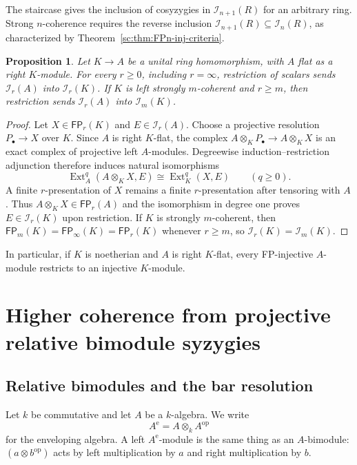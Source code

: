 \documentclass[11pt]{article}
\numberwithin{equation}{section}
\newtheorem{proposition}[theorem]{Proposition}
\theoremstyle{definition}
\theoremstyle{remark}
\newcommand{\Ext}{\operatorname{Ext}}
\newcommand{\FP}{\mathsf{FP}}
\begin{document}
The staircase gives the inclusion of cosyzygies in
$\mathcal I_{n+1}(R)$ for an arbitrary ring.  Strong $n$-coherence
requires the reverse inclusion
$\mathcal I_{n+1}(R)\subseteq\mathcal I_n(R)$, as characterized by
Theorem~\ref{sc:thm:FPn-inj-criteria}.

\begin{proposition}
\label{sc:prop:FPn-restriction}
Let $K\to A$ be a unital ring homomorphism, with $A$ flat as a
right $K$-module.  For every $r\ge0$, including $r=\infty$,
restriction of scalars sends $\mathcal I_r(A)$ into
$\mathcal I_r(K)$.  If $K$ is left strongly $m$-coherent and
$r\ge m$, then restriction sends $\mathcal I_r(A)$ into
$\mathcal I_m(K)$.
\end{proposition}
\begin{proof}
Let $X\in\FP_r(K)$ and $E\in\mathcal I_r(A)$.
Choose a projective resolution $P_\bullet\to X$ over $K$.
Since $A$ is right $K$-flat, the complex
$A\otimes_KP_\bullet\to A\otimes_KX$ is an exact complex of
projective left $A$-modules.  Degreewise induction--restriction
adjunction therefore induces natural isomorphisms
\[
\Ext_A^q(A\otimes_KX,E)\cong\Ext_K^q(X,E)
\qquad(q\ge0).
\]
A finite $r$-presentation of $X$ remains a finite
$r$-presentation after tensoring with $A$.  Thus
$A\otimes_KX\in\FP_r(A)$ and the isomorphism in degree one
proves $E\in\mathcal I_r(K)$ upon restriction.
If $K$ is strongly $m$-coherent, then
$\FP_m(K)=\FP_\infty(K)=\FP_r(K)$ whenever $r\ge m$,
so $\mathcal I_r(K)=\mathcal I_m(K)$.
\end{proof}

In particular, if $K$ is noetherian and $A$ is right $K$-flat,
every FP-injective $A$-module restricts to an injective $K$-module.

\section{Higher coherence from projective relative bimodule syzygies}\label{sec:syzygies}
\subsection{Relative bimodules and the bar resolution}

Let $k$ be commutative and let $A$ be a $k$-algebra.  We write
\[
A^{\mathrm e}=A\otimes_k A^{\mathrm{op}}
\]
for the enveloping algebra.  A left $A^{\mathrm e}$-module is the same
thing as an $A$-bimodule: $(a\otimes b^{\mathrm{op}})$ acts by left
multiplication by $a$ and right multiplication by $b$.
\end{document}
